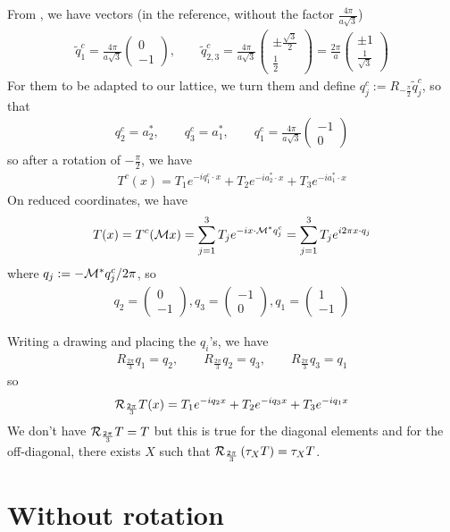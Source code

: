 \documentclass[11pt,a4paper,reqno,french,tikz]{amsart}
\newcommand{\pa}[1]{\left( #1 \right)} %
\newcommand{\f}[2]{\frac{#1}{#2}} %
\newcommand{\mat}[1]{\begin{pmatrix} #1 \end{pmatrix}} %
\begin{document}
From \cite{BecEmbWitZwo21}, we have vectors (in the reference, without the factor $\f{4\pi}{a\sqrt 3}$)
\begin{align*}
	\widetilde{q}^c_1 = \f{4\pi}{a\sqrt 3} \mat{0 \\ -1}, \qquad \widetilde{q}^c_{2,3} =\f{4\pi}{a\sqrt 3} \mat{\pm \f{\sqrt{3}}2 \\ \f 12}  = \f{2\pi}a \mat{\pm 1 \\ \f{1}{\sqrt 3}}
\end{align*}
For them to be adapted to our lattice, we turn them and define $q^c_j := R_{-\f{\pi}2} \widetilde{q}^c_j$, so that
\begin{align*}
q^c_2 = a_2^*,\qquad q^c_3 = a_1^*,\qquad q^c_1 = \f{4\pi}{a\sqrt 3} \mat{-1 \\ 0}
\end{align*}
so after a rotation of $-\f{\pi}2$, we have
\begin{align*}
T^c(x) = T_1 e^{-i q_1^c \cdot x} + T_2 e^{-i a_2^* \cdot x} + T_3 e^{-i a_1^* \cdot x}
\end{align*}
On reduced coordinates, we have
\begin{align*}
T(x) = T^c(\mathcal{M} x) = \sum_{j=1}^3 T_j e^{-i x \cdot \mathcal{M}^* q^c_j} = \sum_{j=1}^3 T_j e^{i 2\pi x \cdot q_j}
\end{align*}
where $q_j :=  -\mathcal{M}^* q^c_j / 2\pi$, so
\begin{align*}
q_2 = \mat{0 \\ -1}, q_3 = \mat{-1 \\ 0}, q_1 = \mat{1 \\ -1}
\end{align*}

Writing a drawing and placing the $q_i$'s, we have
\begin{align*}
R_{\f{2\pi}3} q_1 = q_2, \qquad R_{\f{2\pi}3} q_2 = q_3, \qquad R_{\f{2\pi}3} q_3 = q_1
\end{align*}
so 
\begin{align*}
\cR_{\f{2\pi}3} T (x) = T_1 e^{-i q_2 x} + T_2 e^{-i q_3 x} + T_3 e^{-iq_1 x}
\end{align*}
We don't have $\cR_{\f{2\pi}3} T = T$ but this is true for the diagonal elements and for the off-diagonal, there exists $X$ such that $\cR_{\f{2\pi}3} \pa{\tau_X T} = \tau_X T$.


\section{Without rotation}%
\end{document}
